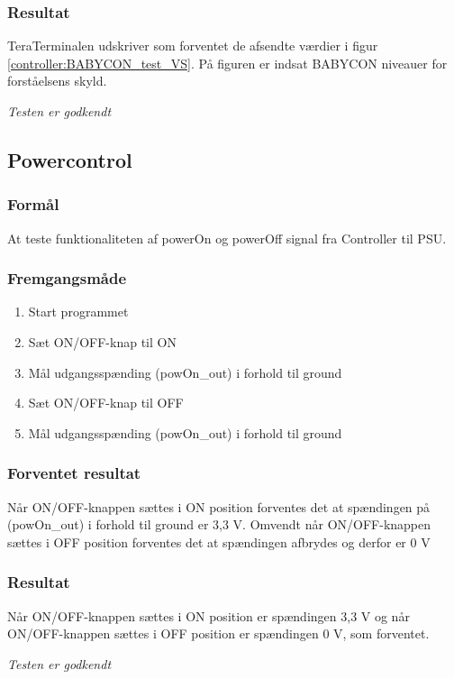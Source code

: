 \subsubsection*{Resultat} 
TeraTerminalen udskriver som forventet de afsendte værdier i figur \ref{controller:BABYCON_test_VS}. På figuren er indsat BABYCON niveauer for forståelsens skyld.


\textit{Testen er godkendt}

\subsection*{Powercontrol}

\subsubsection*{Formål}
At teste funktionaliteten af powerOn og powerOff signal fra Controller til PSU.

\subsubsection*{Fremgangsmåde}
\begin{enumerate}
\item Start programmet
\item Sæt ON/OFF-knap til ON
\item Mål udgangsspænding (powOn\_out) i forhold til ground
\item Sæt ON/OFF-knap til OFF
\item Mål udgangsspænding (powOn\_out) i forhold til ground

\end{enumerate}

\subsubsection*{Forventet resultat}
Når ON/OFF-knappen sættes i ON position forventes det at spændingen på (powOn\_out) i forhold til ground er 3,3 V. Omvendt når ON/OFF-knappen sættes i OFF position forventes det at spændingen afbrydes og derfor er 0 V

\subsubsection*{Resultat} 
Når ON/OFF-knappen sættes i ON position er spændingen 3,3 V og når ON/OFF-knappen sættes i OFF position er spændingen 0 V, som forventet.

\textit{Testen er godkendt}